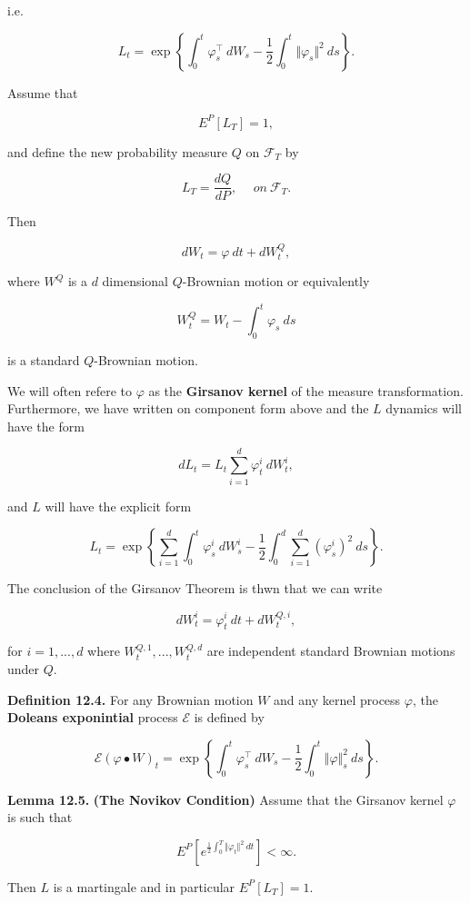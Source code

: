 \documentclass[
]{article}
\begin{document}
i.e.

\[
L_t = \exp\left\{\int_0^t \varphi^\top_s\ dW_s - \frac{1}{2}\int_0^t \Vert\varphi_s\Vert ^2\ ds\right\}.
\]

Assume that

\[
E^P[L_T]=1,
\]

and define the new probability measure \(Q\) on \(\mathcal{F}_T\) by

\[
L_T=\frac{dQ}{dP},\hspace{15pt}on\ \mathcal{F}_T.
\]

Then

\[
dW_t=\varphi\ dt+dW_t^Q,
\]

where \(W^Q\) is a \(d\) dimensional \(Q\)-Brownian motion or
equivalently

\[
W_t^Q=W_t-\int_0^t\varphi_s\ ds
\]

is a standard \(Q\)-Brownian motion.

We will often refere to \(\varphi\) as the \textbf{Girsanov kernel} of
the measure transformation. Furthermore, we have written on component
form above and the \(L\) dynamics will have the form

\[
dL_t=L_t\sum_{i=1}^d\varphi^i_t\ dW_t^i,
\]

and \(L\) will have the explicit form

\[
L_t=\exp\left\{\sum_{i=1}^d\int_0^t\varphi^i_s\ dW_s^i - \frac{1}{2}\int_0^d\sum_{i=1}^d(\varphi^i_s)^2\ ds\right\}.
\]

The conclusion of the Girsanov Theorem is thwn that we can write

\[
dW_t^i=\varphi_t^i\ dt+dW_t^{Q,i},
\]

for \(i=1,...,d\) where \(W_t^{Q,1},...,W_t^{Q,d}\) are independent
standard Brownian motions under \(Q\).

\textbf{Definition 12.4.} For any Brownian motion \(W\) and any kernel
process \(\varphi\), the \textbf{Doleans exponintial} process
\(\mathcal{E}\) is defined by

\[
\mathcal{E}(\varphi\bullet W)_t=\exp\left\{\int_0^t\varphi^\top_s\ dW_s -\frac{1}{2}\int_0^t\Vert \varphi\Vert^2_s\ ds\right\}.
\]

\textbf{Lemma 12.5.} \textbf{(The Novikov Condition)} Assume that the
Girsanov kernel \(\varphi\) is such that

\[
E^P\left[e^{\frac{1}{2}\int_0^T\Vert \varphi_t\Vert^2\ dt}\right]<\infty.
\]

Then \(L\) is a martingale and in particular \(E^P[L_T]=1\).
\end{document}
